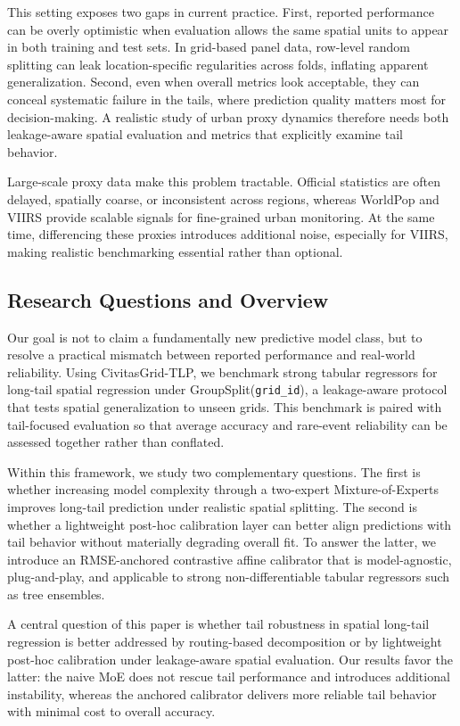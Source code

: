 \documentclass[pdflatex,sn-basic,Numbered]{sn-jnl}
\begin{document}
This setting exposes two gaps in current practice. First, reported performance can be overly optimistic when evaluation allows the same spatial units to appear in both training and test sets. In grid-based panel data, row-level random splitting can leak location-specific regularities across folds, inflating apparent generalization. Second, even when overall metrics look acceptable, they can conceal systematic failure in the tails, where prediction quality matters most for decision-making. A realistic study of urban proxy dynamics therefore needs both leakage-aware spatial evaluation and metrics that explicitly examine tail behavior.

Large-scale proxy data make this problem tractable. Official statistics are often delayed, spatially coarse, or inconsistent across regions, whereas WorldPop and VIIRS provide scalable signals for fine-grained urban monitoring. At the same time, differencing these proxies introduces additional noise, especially for VIIRS, making realistic benchmarking essential rather than optional.

\subsection{Research Questions and Overview}

Our goal is not to claim a fundamentally new predictive model class, but to resolve a practical mismatch between reported performance and real-world reliability. Using CivitasGrid-TLP, we benchmark strong tabular regressors for long-tail spatial regression under GroupSplit(\texttt{grid\_id}), a leakage-aware protocol that tests spatial generalization to unseen grids. This benchmark is paired with tail-focused evaluation so that average accuracy and rare-event reliability can be assessed together rather than conflated.

Within this framework, we study two complementary questions. The first is whether increasing model complexity through a two-expert Mixture-of-Experts improves long-tail prediction under realistic spatial splitting. The second is whether a lightweight post-hoc calibration layer can better align predictions with tail behavior without materially degrading overall fit. To answer the latter, we introduce an RMSE-anchored contrastive affine calibrator that is model-agnostic, plug-and-play, and applicable to strong non-differentiable tabular regressors such as tree ensembles.

A central question of this paper is whether tail robustness in spatial long-tail regression is better addressed by routing-based decomposition or by lightweight post-hoc calibration under leakage-aware spatial evaluation. Our results favor the latter: the naive MoE does not rescue tail performance and introduces additional instability, whereas the anchored calibrator delivers more reliable tail behavior with minimal cost to overall accuracy.
\end{document}
